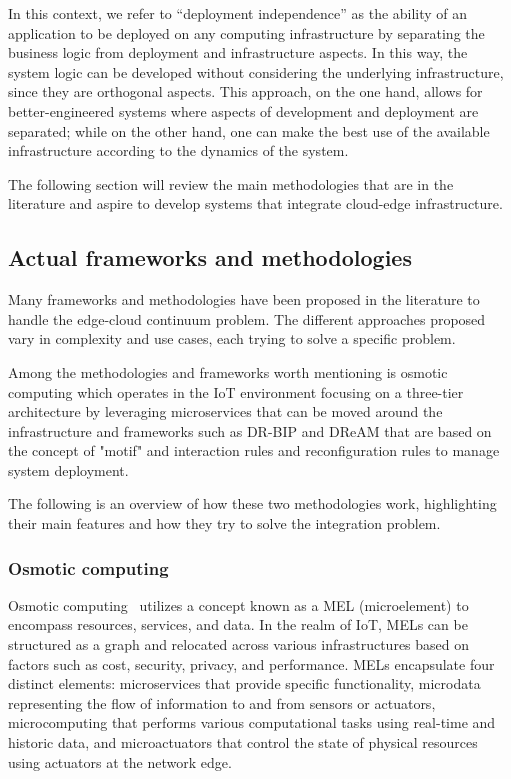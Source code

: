 In this context, we refer to ``deployment independence'' as the ability of an application to be deployed on any computing infrastructure by
separating the business logic from deployment and infrastructure aspects. In this way, the system logic can be developed without considering the
underlying infrastructure, since they are orthogonal aspects. This approach, on the one hand, allows for better-engineered systems where aspects of
development and deployment are separated; while on the other hand, one can make the best use of the available infrastructure according to the
dynamics of the system.

The following section will review the main methodologies that are in the literature and aspire to develop systems that integrate cloud-edge
infrastructure.

\subsection{Actual frameworks and methodologies}
\label{sec:actual-frameworks-methodologies}

Many frameworks and methodologies have been proposed in the literature to handle the edge-cloud continuum problem. The different approaches
proposed vary in complexity and use cases, each trying to solve a specific problem.

Among the methodologies and frameworks worth mentioning is osmotic computing which operates in the IoT environment focusing on a three-tier
architecture by leveraging microservices that can be moved around the infrastructure and frameworks such as DR-BIP and DReAM that are based on the
concept of "motif" and interaction rules and reconfiguration rules to manage system deployment.

The following is an overview of how these two methodologies work, highlighting their main features and how they try to solve the integration problem.

\subsubsection{Osmotic computing}

Osmotic computing~\cite{8781958} utilizes a concept known as a MEL (microelement) to encompass resources, services, and data. In the realm of IoT,
MELs can be structured as a graph and relocated across various infrastructures based on factors such as cost, security, privacy, and performance.
MELs encapsulate four distinct elements: microservices that provide specific functionality, microdata representing the flow of information to and from
sensors or actuators, microcomputing that performs various computational tasks using real-time and historic data, and microactuators that control the
state of physical resources using actuators at the network edge.

